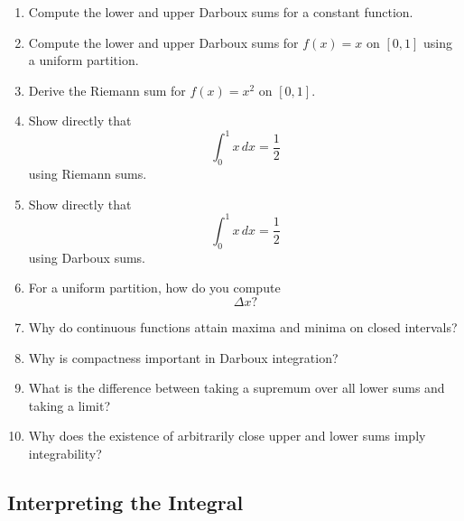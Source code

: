 \begin{enumerate}[resume]
  \item Compute the lower and upper Darboux sums for a constant function.
  \item Compute the lower and upper Darboux sums for \(f(x)=x\) on \([0,1]\) using a uniform partition.
  \item Derive the Riemann sum for \(f(x)=x^{2}\) on \([0,1]\).
  \item Show directly that
    \[ \int_{0}^{1} x\,dx = \frac{1}{2} \]
    using Riemann sums.
  \item Show directly that
    \[ \int_{0}^{1} x\,dx = \frac{1}{2} \]
    using Darboux sums.
  \item For a uniform partition, how do you compute
    \[ \Delta x? \]
  \item Why do continuous functions attain maxima and minima on closed intervals?
  \item Why is compactness important in Darboux integration?
  \item What is the difference between taking a supremum over all lower sums and taking a limit?
  \item Why does the existence of arbitrarily close upper and lower sums imply integrability?
\end{enumerate}

\subsection{Interpreting the Integral}

